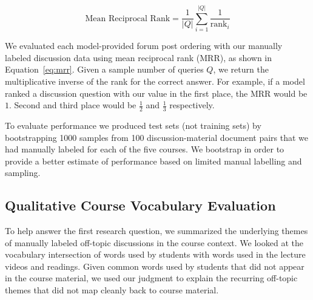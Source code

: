 \documentclass[sigconf, nonacm=true]{acmart}
\begin{document}
\begin{equation}
    \text{Mean Reciprocal Rank} = \frac{1}{|Q|} \sum^{|Q|}_{i=1}\frac{1}{\text{rank}_i}
    \label{eq:mrr}
\end{equation}

We evaluated each model-provided forum post ordering with our manually labeled discussion data using mean reciprocal rank (MRR), as shown in Equation~\ref{eq:mrr}.
Given a sample number of queries $Q$, we return the multiplicative inverse of the rank for the correct answer.
For example, if a model ranked a discussion question with our value in the first place, the MRR would be $1$.
Second and third place would be $\frac{1}{2}$ and $\frac{1}{3}$ respectively.

To evaluate performance we produced test sets (not training sets) by bootstrapping 1000 samples from 100 discussion-material document pairs that we had manually labeled for each of the five courses. 
We bootstrap in order to provide a better estimate of performance based on limited manual labelling and sampling.


\subsection{Qualitative Course Vocabulary Evaluation}
To help answer the first research question, we summarized the underlying themes of manually labeled off-topic discussions in the course context.
We looked at the vocabulary intersection of words used by students with words used in the lecture videos and readings.
Given common words used by students that did not appear in the course material, we used our judgment to explain the recurring off-topic themes that did not map cleanly back to course material.
\end{document}
